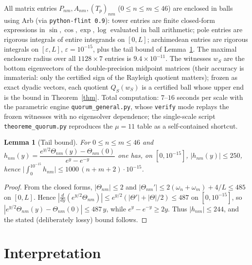\documentclass[10pt]{article}
\newtheorem{lemma}{Lemma}
\begin{document}
All matrix entries $P_{nm},A_{nm},(T_p)_{nm}$ ($0\le n\le m\le46$) are
enclosed in balls using Arb (via \texttt{python-flint 0.9}): tower entries
are finite closed-form expressions in $\sin,\cos,\exp,\log$ evaluated in
ball arithmetic; pole entries are rigorous integrals of entire integrands
on $[0,L]$; archimedean entries are rigorous integrals on
$[\varepsilon,L]$, $\varepsilon=10^{-15}$, plus the tail bound of
Lemma~\ref{lem:tail}. The maximal enclosure radius over all $1128\times7$
entries is $9.4\times10^{-11}$. The witnesses $w_S$ are the bottom
eigenvectors of the double-precision midpoint matrices (their accuracy is
immaterial: only the certified sign of the Rayleigh quotient matters);
frozen as exact dyadic vectors, each quotient $Q_S(w_S)$ is a certified
ball whose upper end is the bound in Theorem~\ref{thm}. Total computation: $7$--$16$ seconds per scale with the parametric engine
\texttt{quorum\_general.py}, whose \texttt{verify} mode replays the
frozen witnesses with no eigensolver dependence; the single-scale script
\texttt{theoreme\_quorum.py} reproduces the $\mu=11$ table as a
self-contained shortcut.

\begin{lemma}[Tail bound]\label{lem:tail}
For $0\le n\le m\le 46$ and $h_{nm}(y)=\dfrac{e^{y/2}\Theta_{nm}(y)-
\Theta_{nm}(0)}{e^{y}-e^{-y}}$ one has, on $[0,10^{-15}]$,
$|h_{nm}(y)|\le 250$, hence
$\big|\int_0^{10^{-15}}h_{nm}\big|\le 1000\,(n+m+2)\cdot10^{-15}$.
\end{lemma}
\begin{proof}
From the closed forms, $|\Theta_{nm}|\le2$ and
$|\Theta_{nm}'|\le 2(\omega_n+\omega_m)+4/L\le485$ on $[0,L]$. Hence
$|\frac{d}{dy}(e^{y/2}\Theta_{nm})|\le e^{y/2}(|\Theta'|+|\Theta|/2)
\le487$ on $[0,10^{-15}]$, so
$|e^{y/2}\Theta_{nm}(y)-\Theta_{nm}(0)|\le487\,y$, while
$e^{y}-e^{-y}\ge2y$. Thus $|h_{nm}|\le244$, and the stated (deliberately
lossy) bound follows.
\end{proof}

\section{Interpretation}
\end{document}
